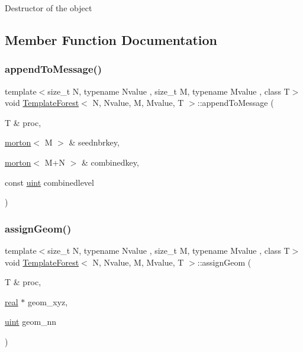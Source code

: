 Destructor of the object 

\subsection{Member Function Documentation}
\mbox{\label{classTemplateForest_a14f94cdb193a07e4488e3463c73f99e9}} 
\subsubsection{\texorpdfstring{append\+To\+Message()}{appendToMessage()}}
{\footnotesize\ttfamily template$<$size\+\_\+t N, typename Nvalue , size\+\_\+t M, typename Mvalue , class T$>$ \\
void \mbox{\hyperlink{classTemplateForest}{Template\+Forest}}$<$ N, Nvalue, M, Mvalue, T $>$\+::append\+To\+Message (\begin{DoxyParamCaption}\item[{T \&}]{proc,  }\item[{\mbox{\hyperlink{definitions_8h_af8682350bd8bb38ee9023f7a0a310add}{morton}}$<$ M $>$ \&}]{seednbrkey,  }\item[{\mbox{\hyperlink{definitions_8h_af8682350bd8bb38ee9023f7a0a310add}{morton}}$<$ M+N $>$ \&}]{combinedkey,  }\item[{const \mbox{\hyperlink{definitions_8h_a69aa29b598b851b0640aa225a9e5d61d}{uint}}}]{combinedlevel }\end{DoxyParamCaption})}

\mbox{\label{classTemplateForest_a81eba445f5dd75c651ec4477128e38ba}} 
\subsubsection{\texorpdfstring{assign\+Geom()}{assignGeom()}}
{\footnotesize\ttfamily template$<$size\+\_\+t N, typename Nvalue , size\+\_\+t M, typename Mvalue , class T$>$ \\
void \mbox{\hyperlink{classTemplateForest}{Template\+Forest}}$<$ N, Nvalue, M, Mvalue, T $>$\+::assign\+Geom (\begin{DoxyParamCaption}\item[{T \&}]{proc,  }\item[{\mbox{\hyperlink{definitions_8h_aedc0ad84d1e764530814f57ad931d02a}{real}} $\ast$}]{geom\+\_\+xyz,  }\item[{\mbox{\hyperlink{definitions_8h_a69aa29b598b851b0640aa225a9e5d61d}{uint}}}]{geom\+\_\+nn }\end{DoxyParamCaption})}

